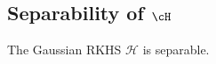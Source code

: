







\subsection{Separability of $\cH$}
\begin{lemma}
The Gaussian RKHS $\mathcal{H}$ is separable.    
\end{lemma}

